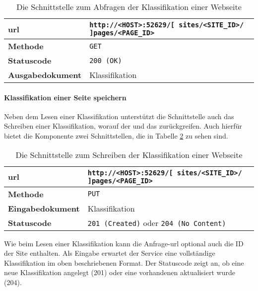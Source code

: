     \begin{table}[htb]
        \centering
        \begin{tabular}{|l|l|}
        \hline
        \textbf{\gls{url}} & \texttt{http://<HOST>:52629/[ sites/<SITE\_ID>/ ]pages/<PAGE\_ID>}\\
        \hline
        \textbf{Methode} & \texttt{GET}\\
        \hline
        \textbf{Statuscode} & \texttt{200 (OK)}\\
        \hline
        \textbf{Ausgabedokument} & Klassifikation\\
        \hline
        \end{tabular}
        \caption{Die Schnittstelle zum Abfragen der Klassifikation einer Webseite}
        \label{table:getFullPageInterface}
    \end{table}

    \paragraph*{Klassifikation einer Seite speichern}
    Neben dem Lesen einer Klassifikation unterstützt die Schnittstelle auch das Schreiben einer Klassifikation,
    worauf der {\classificationService} und das {\annotatorPlugin} zurückgreifen.
    Auch hierfür bietet die Komponente zwei Schnittstellen, die in Tabelle \ref{table:writePageInterface} zu sehen sind.

    \begin{table}[htb]
        \centering
        \begin{tabular}{|l|l|}
        \hline
        \textbf{\gls{url}} & \texttt{http://<HOST>:52629/[ sites/<SITE\_ID>/ ]pages/<PAGE\_ID>}\\
        \hline
        \textbf{Methode} & \texttt{PUT}\\
        \hline
        \textbf{Eingabedokument} & Klassifikation\\
        \hline
        \textbf{Statuscode} & \texttt{201 (Created)} oder \texttt{204 (No Content)}\\
        \hline
        \end{tabular}
        \caption{Die Schnittstelle zum Schreiben der Klassifikation einer Webseite}
        \label{table:writePageInterface}
    \end{table}

    Wie beim Lesen einer Klassifikation kann die Anfrage-\gls{url} optional auch die ID der Site enthalten.
    Als Eingabe erwartet der Service eine vollständige Klassifikation im oben beschriebenen Format.
    Der Statuscode zeigt an, ob eine neue Klassifikation angelegt (201) oder eine vorhandenen aktualisiert wurde (204).
